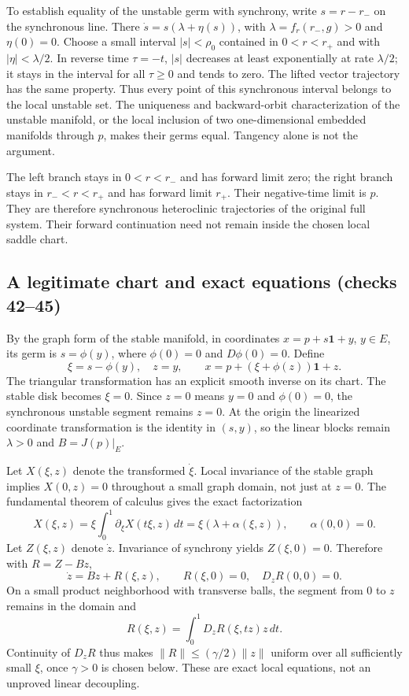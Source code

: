 \documentclass[11pt]{article}
\newcommand{\one}{\mathbf1}
\newcommand{\norm}[1]{\lVert#1\rVert}
\begin{document}
To establish equality of the unstable germ with synchrony, write
$s=r-r_-$ on the synchronous line. There
$\dot s=s(\lambda+\eta(s))$, with $\lambda=f_r(r_-,g)>0$ and
$\eta(0)=0$. Choose a small interval $|s|<\rho_0$ contained in
$0<r<r_+$ and with $|\eta|<\lambda/2$. In reverse time $\tau=-t$,
$|s|$ decreases at least exponentially at rate $\lambda/2$; it stays in
the interval for all $\tau\ge0$ and tends to zero. The lifted vector
trajectory has the same property. Thus every point of this synchronous
interval belongs to the local unstable set. The uniqueness and backward-orbit
characterization of the unstable manifold, or the local inclusion of two
one-dimensional embedded manifolds through $p$, makes their germs equal.
Tangency alone is not the argument.

The left branch stays in $0<r<r_-$ and has forward limit zero; the right
branch stays in $r_-<r<r_+$ and has forward limit $r_+$. Their negative-time
limit is $p$. They are therefore synchronous heteroclinic trajectories of
the original full system. Their forward continuation need not remain inside
the chosen local saddle chart.

\subsection{A legitimate chart and exact equations (checks 42--45)}
By the graph form of the stable manifold, in coordinates
$x=p+s\one+y$, $y\in E$, its germ is $s=\phi(y)$, where
$\phi(0)=0$ and $D\phi(0)=0$. Define
\[
 \xi=s-\phi(y),\quad z=y,\qquad
 x=p+(\xi+\phi(z))\one+z.
\]
The triangular transformation has an explicit smooth inverse on its chart.
The stable disk becomes $\xi=0$. Since $z=0$ means $y=0$ and
$\phi(0)=0$, the synchronous unstable segment remains $z=0$.
At the origin the linearized coordinate transformation is the identity in
$(s,y)$, so the linear blocks remain $\lambda>0$ and $B=J(p)|_E$.

Let $X(\xi,z)$ denote the transformed $\dot\xi$. Local invariance of the
stable graph implies $X(0,z)=0$ throughout a small graph domain, not just at
$z=0$. The fundamental theorem of calculus gives the exact factorization
\[
 X(\xi,z)=\xi\int_0^1\partial_\xi X(t\xi,z)\,dt
         =\xi(\lambda+\alpha(\xi,z)),\qquad\alpha(0,0)=0.
\]
Let $Z(\xi,z)$ denote $\dot z$. Invariance of synchrony yields
$Z(\xi,0)=0$. Therefore with $R=Z-Bz$,
\[
 \dot z=Bz+R(\xi,z),\qquad R(\xi,0)=0,\quad D_zR(0,0)=0.
\]
On a small product neighborhood with transverse balls, the segment from
$0$ to $z$ remains in the domain and
\[
 R(\xi,z)=\int_0^1D_zR(\xi,tz)z\,dt.
\]
Continuity of $D_zR$ thus makes $\norm R\le(\gamma/2)\norm z$ uniform
over all sufficiently small $\xi$, once $\gamma>0$ is chosen below.
These are exact local equations, not an unproved linear decoupling.
\end{document}
